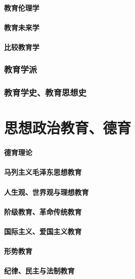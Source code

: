 \documentclass[UTF8]{../../ApplicationUniverse}
\begin{document}
        \subsubsection{教育伦理学}
        \subsubsection{教育未来学}
        \subsubsection{比较教育学}

    \subsection{教育学派}
    \subsection{教育学史、教育思想史}





\chapter{思想政治教育、德育}
    \subsubsection{德育理论}
    \subsubsection{马列主义毛泽东思想教育}
    \subsubsection{人生观、世界观与理想教育}
    \subsubsection{阶级教育、革命传统教育}
    \subsubsection{国际主义、爱国主义教育}
    \subsubsection{形势教育}
    \subsubsection{纪律、民主与法制教育}
\end{document}
